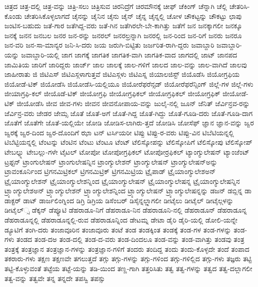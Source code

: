 {ಚಿತ್ರದ
ಚಿತ್ರ-ದಲ್ಲಿ
ಚಿತ್ರ-ವನ್ನು
ಚಿತ್ರಿ-ಸಲು
ಚಿತ್ರಿಸುವ
ಚಿರನಿದ್ರೆಗೆ
ಚಿರಮೌನಕ್ಕೆ
ಚೀಫ್
ಚೆಕಿಂಗ್
ಚೆನ್ನಾಗಿ
ಚೆಲ್ಲಿ
ಚೇತರಿಸಿ-ಕೊಂಡು
ಚೇತರಿಸಿಕೊಳ್ಳಲಾಗದೆ
ಚೈನನ್ನು
ಚೈನಿನ
ಚೈನು
ಚೈನ್
ಚೈನ್ನ
ಚೈನ್ನಲ್ಲಿ
ಚೋಳ
ಚೌಕಟ್ಟನ್ನು
ಚೌಕಟ್ಟು
ಛಾಪು
ಜಂಟಿಸ-ಬಹುದು
ಜತೆ-ಗಾರ
ಜತೆಗಿದ್ದ-ವರು
ಜತೆ-ಗಿನ
ಜತೆಗಿರಲೇ-ಬೇ-ಕಾಗಿತ್ತು
ಜತೆಗೆ
ಜನ
ಜನಕ್ಕಾಗಲೀ
ಜನಕ್ಕೂ
ಜನಕ್ಕೆ
ಜನನ
ಜನಬಲ
ಜನರ
ಜನ-ರನ್ನು
ಜನರಲ್
ಜನರಲ್ರನ್ನಾಗಿ
ಜನರಲ್ಲಿ
ಜನ-ರಿಂದ
ಜನ-ರಿಗೆ
ಜನರು
ಜನರೂ
ಜನ-ವರಿ
ಜನ-ಸಾ-ಮಾನ್ಯರ
ಜನಿ-ಸಿ-ದರು
ಜಯ
ಜರುಗಿ-ಬಿಟ್ಟಿತು
ಜರ್ಜರಿತ-ರಾಗಿ-ದ್ದರು
ಜವಾಬ್ದಾರಿ
ಜವಾಬ್ದಾರಿ-ಯನ್ನು
ಜವಾಬ್ದಾರಿ-ಯಲ್ಲಿ
ಜಾಗ
ಜಾಗಕ್ಕೆ
ಜಾಗತಿಕ
ಜಾಗತಿಕ-ವಾಗಿ
ಜಾಗತಿಕ-ವಾದ
ಜಾಗದಲ್ಲಿ
ಜಾಟ್
ಜಾನಪದ
ಜಾಮಿತಿಯ
ಜಾರಿಗೆ
ಜಾರಿದ್ದರು
ಜಾರ್ಜ್
ಜಾಲ
ಜಾಲಕ್ಕೆ
ಜಾಲ-ಗಳಿಗೆ
ಜಾಲದ
ಜಾಲ-ವನ್ನು
ಜಾಲ-ವಾಗಿದೆ
ಜಾಲವು
ಜಾಹೀರಾತು
ಜಿ
ಜಿಟಿಎಸ್
ಜಿಟಿಎಸ್ಗಳಾಗುತ್ತವೆ
ಜಿಟಿಎಸ್ಗಳು
ಜಿಟಿಎಸ್ನ
ಜಿಯಾಲಜಿಸ್ಟ್
ಜಿಯೊಡೆಸಿ
ಜಿಯೋಗ್ರಫಿಯ
ಜಿಯೋಡೆ-ಟಿಕ್
ಜಿಯೋಡೆಸಿ
ಜಿಯೋಡೆಸಿ-ಯಲ್ಲಿಯೂ
ಜಿಯೋರೆಫರೆನ್ಸಡ್
ಜಿಯೋರೆಫರೆನ್ಸಿಂಗ್
ಜಿಲ್ಲೆ-ಗಳ
ಜಿಲ್ಲೆ-ಗಳು
ಜೀಯಾಗ್ರಫಿ-ಕಲ್
ಜೀಯೊಡೆ-ಟಿಕ್
ಜೀಯೋಗ್ರಫಿ
ಜೀಯೋಗ್ರಫಿಕಲ್
ಜೀಯೋಗ್ರಫಿಕಲ್
ಜೀಯೋಗ್ರಫಿಕ್
ಜೀಯೋಡೆ-ಟಿಕ್
ಜೀಯೋಡೆಸಿ
ಜೀವ
ಜೀವ-ಗಳು
ಜೀವನ
ಜೀವನೋಪಾಯ-ವನ್ನು
ಜುಲೈ-ನಲ್ಲಿ
ಜೂನ್
ಜೆನಿತ್
ಜೆರ್ವಿನ್ರವ-ರನ್ನು
ಜೆರ್ವಿನ್ರ-ವರು
ಜೇಡರ
ಜೇಮ್ಸ
ಜೊತೆ
ಜೊತೆ-ಅಗೆ
ಜೊತೆ-ಗಿದ್ದ
ಜೊತೆ-ಗಿದ್ದು
ಜೊತೆ-ಗೂಡಿ-ದರು
ಜೊತೆ-ಗೂಡಿ-ದಾಗ
ಜೊತೆಗೆ
ಜೊತೆಗೇ
ಜೊತೆ-ಯಲ್ಲಿಯೇ
ಜೋಡಿ
ಜೋಡಿಸ-ಲಾಗಿರು-ತ್ತದೆ
ಜೋಡಿಸಿ
ಜೋಸೆಫ್
ಜ್ಞಾನ
ಜ್ಞಾನ-ವನ್ನು
ಜ್ವರ
ಜ್ವರಕ್ಕೆ
ಜ್ವರ-ದಿಂದ
ಜ್ವರ-ದೊಂದಿಗೆ
ಝಾ
ಟನ್
ಟರ್ಸಿಯರೀ
ಟಿಪ್ಪು
ಟಿಪ್ಪು-ರ-ವರು
ಟಿಪ್ಪು-ವಿನ
ಟಿಬೆಟಿಯನ್ನಲ್ಲಿ
ಟಿಬೆಟ್ಟಿಯನ್ನಲ್ಲಿ
ಟೆಂಟನ್ನು
ಟೆಂಟಿನ
ಟೆಂಟು
ಟೆಂಟೂ
ಟೆಂಟ್
ಟೆಲಿಸ್ಕೋಪನ್ನು
ಟೆಲಿಸ್ಕೋಪಿಗೆ
ಟೆಲಿಸ್ಕೋಪು
ಟೆಲಿಸ್ಕೋಪ್
ಟೇಬಲ್ನ್ನು
ಟೇಬಲ್ಲು-ಗಳೇ
ಟೈಟಲ್
ಟೋಪೋ
ಟೋಪೋಗ್ರಫಿಕಲ್
ಟೋಪೋರ್ರಫಿಕಲ್
ಟ್ಯಾಂಗ್ಯುಲೇಷನ್
ಟ್ಯಾಂಜೆಂಟ್
ಟ್ರಫ್ಟನ್
ಟ್ರಾಂಗುಲೇಷನ್
ಟ್ರಾಂಗುಲೇಷನ್ನಿನ
ಟ್ರಾಂಗ್ಯುಲೇಶನ್
ಟ್ರಾಂಗ್ಯುಲೇಷನ್
ಟ್ರಾಂಗ್ಯುಲೇಷನ್ಅನ್ನು
ಟ್ರಾವಂಕೂರ್ನಿಂದ
ಟ್ರಿಗನಮಿಟ್ರಿಕಲ್
ಟ್ರಿಗನಮಿಟ್ರಿಕ್
ಟ್ರಿಗನಮಿಟ್ರಿಯ
ಟ್ರೈಪಾಡ್
ಟ್ರೈಯಾಂಗ್ಯುಲೇಶಅನ್
ಟ್ರೈಯಾಂಗ್ಯುಲೇಶನ್
ಟ್ರೈಯಾಂಗ್ಯುಲೇಶನ್ನಿಂದ
ಟ್ರೈಯಾಂಗ್ಯುಲೇಷನ್
ಟ್ರೈಯಾಂಗ್ಯುಲೇಷನ್ನ
ಟ್ರೈಯಾಂಗ್ಯುಲೇಷನ್ನಿನ
ಟ್ರ್ಯಾಂಗ್ಯುಲೇಶಅನ್
ಟ್ರ್ಯಾಂಗ್ಯುಲೇಶನ್
ಟ್ರ್ಯಾಂಗ್ಯುಲೇಶನ್ನಿಂದ
ಟ್ರ್ಯಾಂಗ್ಯುಲೇಷನ್
ಟ್ರ್ಯಾಂಗ್ಯುಲೇಷನ್ನನ್ನು
ಡಜನ್
ಡಬ್ಲಿನ್ನ
ಡಾ
ಡಾಕ್ಟರ್
ಡಾಟ್
ಡಾರ್ಜಲಿಂಗ್ನಿಂದ
ಡಿಗ್ರಿ
ಡಿಗ್ರಿಯ
ಡಿಸೆಂಬರ್
ಡಿಸೈನ್ನಲ್ಲ್ಲಾಗಲೀ
ಡೀಟೈಲು
ಡೀಟೈಲ್
ಡೀಟೈಲ್ಗಳನ್ನು
ಡೀಟೈಲ್್ಸ
ಡೆಕ್ಕನ್
ಡೆಪ್ಯೂಟಿ
ಡೆಹರಾಡೂ-ನಿಗೆ
ಡೆಹರಾಡೂ-ನಿನ
ಡೆಹರಾಡೂನಿ-ನಲ್ಲಿ
ಡೆಹರಾಡೂನ್
ಡೆಹರಾಡೂನ್ನ
ಡೆಹರಾಡೂನ್ನಲ್ಲಿ
ಡೆಹರಾಡೂನ್ನಲ್ಲಿ-ರುವ
ಡೆಹರಾಡೂನ್ನಿಂದ
ಡೇಟಮ್ನ
ಡೇಟಾ
ಡೈರಿ
ಡೈರಿ-ಯಲ್ಲಿ
ಡೋಲಿ-ಯನ್ನೇ
ಡ್ಯೂಟಿಗೆ
ತಂಗಿ-ದರು
ತಂಜಾವೂರಿನ
ತಂಜಾವೂರು
ತಂಟೆ
ತಂಡ
ತಂಡಕ್ಕಿಂತ
ತಂಡಕ್ಕೆ
ತಂಡ-ಗಳ
ತಂಡ-ಗಳನ್ನು
ತಂಡ-ಗಳು
ತಂಡದ
ತಂಡ-ದಅ
ತಂಡ-ದಲ್ಲಿ
ತಂಡ-ದ-ವರು
ತಂಡ-ದಿಂದಲೂ
ತಂಡ-ವನ್ನು
ತಂಡ-ವಾಗಿತ್ತು
ತಂಡವು
ತಂತ್ರ
ತಂತ್ರಕ್ಕೆ
ತಂತ್ರಜ್ಞಾನ
ತಂತ್ರಜ್ಞಾನ-ಗಳನ್ನು
ತಂತ್ರಜ್ಞಾನ-ಗಳಿಗೆ
ತಂದರು
ತಂದಿದ್ದ
ತಂದು
ತಂದು-ಕೊಳ್ಳದೇ
ತಂದೆ
ತಂಪಾದ
ತಕರಾರು-ಗಳು
ತಕ್ಷಣ
ತಕ್ಷಣವೇ
ತಗಲುತ್ತದೆ
ತಗ್ಗು
ತಗ್ಗು-ಗಳನ್ನು
ತಗ್ಗು-ಗಳಿಂದ
ತಗ್ಗು-ಗಳಿಲ್ಲಿದ
ತಗ್ಗು-ಗಳು
ತಜ್ಞರು
ತಟ್ಟಿ
ತಟ್ಟಿ-ಕೊಳ್ಳುವಂತೆ
ತಟ್ಟೆಯ
ತಟ್ಟೆ-ಯನ್ನು
ತಡಿ-ಯಿಂದ
ತಣ್ಣ-ಗಾಗಿ
ತತ್ತರಿಸಿತು
ತತ್ವ
ತತ್ವ-ಗಳನ್ನು
ತತ್ವದ
ತತ್ವ-ದಲ್ಲಾಗಲೀ
ತತ್ವ-ವನ್ನು
ತತ್ವವೇ
ತನ್ನ
ತನ್ನದೇ
ತಪಸ್ವಿ
ತಪಸ್ಸು
}
